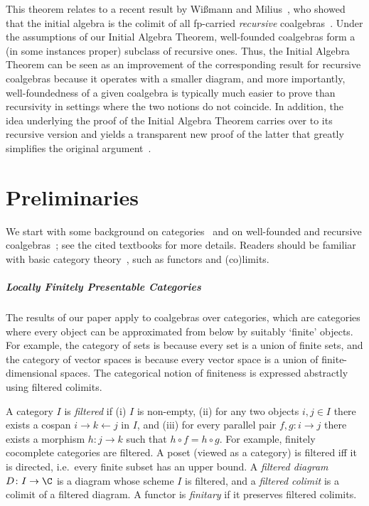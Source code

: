 \documentclass[a4paper,UKenglish, autoref, numberwithinsect, final]{lipics-v2021}
\numberwithin{equation}{section}
\theoremstyle{plain}
\theoremstyle{definition}
\begin{document}
\medskip\noindent This theorem relates to a recent result by Wißmann and Milius~\cite{wm24}, who showed that the initial algebra is the colimit of all fp-carried \emph{recursive} coalgebras~\cite{taylor99}. Under the assumptions of our Initial Algebra Theorem, well-founded coalgebras form a (in some instances proper) subclass of recursive ones. Thus,
the Initial Algebra Theorem can be seen as an improvement of the corresponding result for recursive coalgebras because it operates with a smaller diagram, and more importantly, well-foundedness of a given coalgebra is typically much easier to prove than recursivity in settings where the two notions do not coincide. In addition, the idea underlying the proof of the Initial Algebra Theorem carries over to its recursive version and yields a transparent new proof of the latter that greatly simplifies the original argument~\cite{wm24}.


\section{Preliminaries}\label{sec:prelim}
We start with some background on \lfplong categories~\cite{adamek_rosicky_1994} and on well-founded and recursive coalgebras~\cite{amm25,taylor99}; see the cited textbooks for more details. Readers should be familiar with basic category theory~\cite{mac2013categories}, such as functors and (co)limits.



\subparagraph*{Locally Finitely Presentable Categories}
The results of our paper apply to coalgebras over \lfplong categories, which are categories where every object can be approximated from below by suitably `finite' objects. For example, the category of sets is \lfplong because every set is a union of finite sets, and the category of vector spaces is \lfplong because every vector space is a  union of finite-dimensional spaces. The categorical notion of finiteness is expressed abstractly using filtered colimits.

A category $I$ is \emph{filtered} if (i) $I$ is non-empty, (ii) for any two objects $i,j\in I$ there exists a cospan $i\to k \leftarrow j$ in $I$, and (iii) for every parallel pair $f,g\colon i\to j$ there exists a morphism $h\colon j\to k$ such that $h\circ f = h\circ g$. For example, finitely cocomplete categories are filtered. A poset (viewed as a category) is filtered iff it is directed, i.e.\ every finite subset has an upper bound. A \emph{filtered diagram} $D\colon I\to \C$ is a diagram whose scheme $I$ is filtered, and a \emph{filtered colimit} is a colimit of a filtered diagram. A functor is \emph{finitary} if it preserves filtered colimits.
\end{document}
